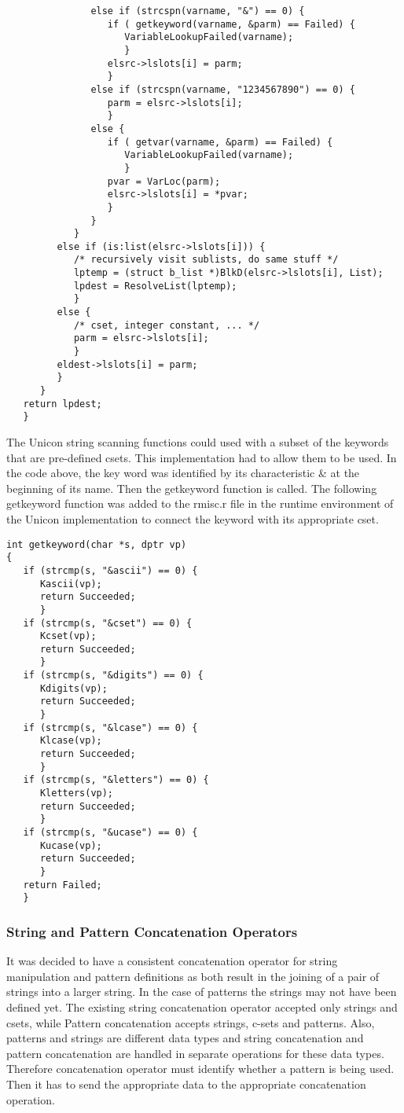 \documentclass{article}
\begin{document}
\begin{verbatim}
               else if (strcspn(varname, "&") == 0) {
                  if ( getkeyword(varname, &parm) == Failed) {
                     VariableLookupFailed(varname);
                     }
                  elsrc->lslots[i] = parm;
                  }
               else if (strcspn(varname, "1234567890") == 0) {
                  parm = elsrc->lslots[i];
                  }
               else {
                  if ( getvar(varname, &parm) == Failed) {
                     VariableLookupFailed(varname);
                     }
                  pvar = VarLoc(parm);
                  elsrc->lslots[i] = *pvar;
                  }
               }
            }
         else if (is:list(elsrc->lslots[i])) {
            /* recursively visit sublists, do same stuff */
            lptemp = (struct b_list *)BlkD(elsrc->lslots[i], List);
            lpdest = ResolveList(lptemp);
            }
         else { 
            /* cset, integer constant, ... */
            parm = elsrc->lslots[i];
            }
         eldest->lslots[i] = parm;
         }
      }
   return lpdest;
   }
\end{verbatim}
The Unicon string scanning functions could used with a subset of the keywords that are pre-defined csets.  This implementation had to allow them to be used.  In the code above, the key word was identified by its characteristic \& at the beginning of its name.  Then the getkeyword function is called.  The following getkeyword function was added to the rmisc.r file in the runtime environment of the Unicon implementation to connect the keyword with its appropriate cset.
\begin{verbatim}
int getkeyword(char *s, dptr vp)
{
   if (strcmp(s, "&ascii") == 0) {
      Kascii(vp);
      return Succeeded;
      }
   if (strcmp(s, "&cset") == 0) {
      Kcset(vp);
      return Succeeded;
      }
   if (strcmp(s, "&digits") == 0) {
      Kdigits(vp);
      return Succeeded;
      }
   if (strcmp(s, "&lcase") == 0) {
      Klcase(vp);
      return Succeeded;
      }
   if (strcmp(s, "&letters") == 0) {
      Kletters(vp);
      return Succeeded;
      }
   if (strcmp(s, "&ucase") == 0) {
      Kucase(vp);
      return Succeeded;
      }
   return Failed;
   }
\end{verbatim}

\subsubsection{String and Pattern Concatenation Operators}
It was decided to have a consistent concatenation operator for string manipulation and pattern definitions as both result in the joining of a pair of strings into a larger string.  In the case of patterns the strings may not have been defined yet.  The existing string concatenation operator accepted only strings and csets, while Pattern concatenation accepts strings, c-sets and patterns.  Also, patterns and strings are different data types and string concatenation and pattern concatenation are handled in separate operations for these data types.  Therefore concatenation operator must identify whether a pattern is being used.  Then it has to send the appropriate data to the appropriate concatenation operation.
\end{document}
